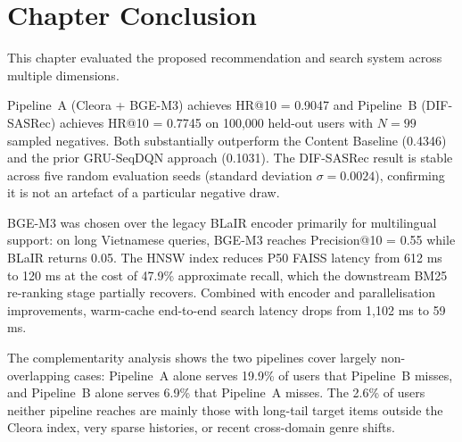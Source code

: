 \section{Chapter Conclusion}

This chapter evaluated the proposed recommendation and search system across multiple dimensions.

Pipeline~A (Cleora + BGE-M3) achieves HR@10 = 0.9047 and Pipeline~B (DIF-SASRec) achieves HR@10 = 0.7745 on 100{,}000 held-out users with $N = 99$ sampled negatives.
Both substantially outperform the Content Baseline (0.4346) and the prior GRU-SeqDQN approach (0.1031).
The DIF-SASRec result is stable across five random evaluation seeds (standard deviation $\sigma = 0.0024$), confirming it is not an artefact of a particular negative draw.

BGE-M3 was chosen over the legacy BLaIR encoder primarily for multilingual support: on long Vietnamese queries, BGE-M3 reaches Precision@10 = 0.55 while BLaIR returns 0.05.
The HNSW index reduces P50 FAISS latency from 612 ms to 120 ms at the cost of 47.9\% approximate recall, which the downstream BM25 re-ranking stage partially recovers.
Combined with encoder and parallelisation improvements, warm-cache end-to-end search latency drops from 1{,}102 ms to 59 ms.

The complementarity analysis shows the two pipelines cover largely non-overlapping cases: Pipeline~A alone serves 19.9\% of users that Pipeline~B misses, and Pipeline~B alone serves 6.9\% that Pipeline~A misses.
The 2.6\% of users neither pipeline reaches are mainly those with long-tail target items outside the Cleora index, very sparse histories, or recent cross-domain genre shifts.

